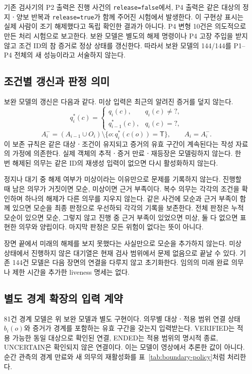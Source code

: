 \begin{revision}
기존 검사기의 P2 출력은 진행 사건의 \texttt{release=false}에서, P4 출력은 같은 대상의 정지ㆍ양보 반복과 \texttt{release=true}가 함께 주어진 시험에서 발생한다. 이 구현상 표시는 실제 사람이 조기 해제했다고 독립 확인한 결과가 아니다. P4 변형 10건은 의도적으로 만든 처리 시험으로 보고한다. 보완 모델은 별도의 해제 명령이나 P4 고장 주입을 받지 않고 조건 ID의 참 증거로 정상 상태를 갱신한다. 따라서 보완 모델의 144/144를 P1--P4 전체의 새 성능이라고 서술하지 않는다.

\subsection{조건별 갱신과 판정 의미}
\label{sec:semantics}
보완 모델의 갱신은 다음과 같다. 미상 입력은 최근의 알려진 증거를 덮지 않는다.
\begin{equation}
q_i^*(c)=\begin{cases}q_i(c),&q_i(c)\ne ?,\\q_{i-1}^*(c),&q_i(c)=?,\end{cases}
\end{equation}
\begin{equation}
A_i^-=(A_{i-1}\cup O_i)\setminus\{o:q_i^*(c(o))=\mathsf{T}\},\qquad A_i=A_i^- .
\label{eq:active-update}
\end{equation}
이 보존 규칙은 같은 대상ㆍ조건이 유지되고 증거의 유효 구간이 계속된다는 작성 자료의 가정에 의존한다. 실제 객체의 추적ㆍ증거 만료ㆍ재등장은 모델링하지 않는다. 한 번 해제된 의무는 같은 ID의 재생성 입력이 없으면 다시 활성화하지 않는다.

정지나 대기 중 해제 여부가 미상이라는 이유만으로 문제를 기록하지 않는다. 진행할 때 남은 의무가 거짓이면 모순, 미상이면 근거 부족이다. 복수 의무는 각각의 조건을 확인하며 하나의 해제가 다른 의무를 지우지 않는다. 같은 사건에 모순과 근거 부족이 함께 있으면 모순을 최종 판정으로 우선하되 각각의 기록을 보존한다. 전체 판정은 누적 모순이 있으면 모순, 그렇지 않고 진행 중 근거 부족이 있었으면 미상, 둘 다 없으면 표현한 의무와 양립이다. 마지막 판정은 모든 위험이 없다는 뜻이 아니다.

장면 끝에서 미래의 해제를 보지 못했다는 사실만으로 모순을 추가하지 않는다. 미상 상태에서 진행하지 않은 대기열은 현재 검사 범위에서 문제 없음으로 끝날 수 있다. 기존 144건 모델은 다음 장면의 연결을 다루지 않고 초기화한다. 임의의 미래 완료 의무나 제한 시간을 추가한 liveness 명세는 없다.

\subsection{별도 경계 확장의 입력 계약}
\label{sec:boundary-semantics}
81건 경계 모델은 위 보완 모델과 별도 구현이다. 의무별 대상ㆍ적용 범위 연결 상태 $b_i(o)$와 증거가 경계를 포함하는 유효 구간을 갖는지 입력받는다. VERIFIED는 적용 가능한 동일 대상으로 확인된 연결, ENDED는 적용 범위의 명시적 종료, UNCERTAIN은 확인되지 않은 연결이다. 이는 모델이 영상에서 추론한 값이 아니다. 순간 관측의 경계 만료와 새 의무의 재활성화를 표~\ref{tab:boundary-policy}처럼 처리한다.


\end{revision}
